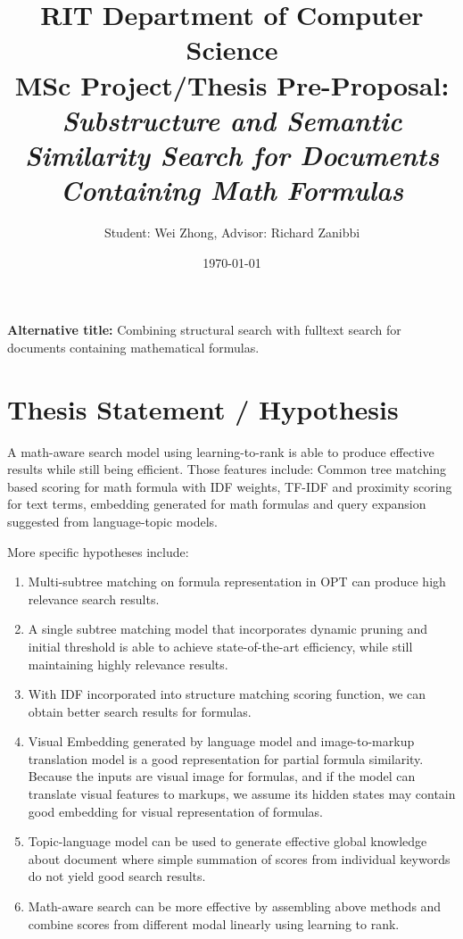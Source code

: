 \documentclass[11pt]{artikel3}
\title{RIT Department of Computer Science\\MSc Project/Thesis Pre-Proposal:\\\emph{Substructure and Semantic Similarity Search for Documents
Containing Math Formulas}}
\author{Student: Wei Zhong, Advisor: Richard Zanibbi}
\date{\today}
\begin{document}
\maketitle

\textbf{Alternative title:} Combining structural search with fulltext search for documents containing mathematical formulas.

\section{Thesis Statement / Hypothesis}
A math-aware search model using learning-to-rank is able to produce effective results while still being efficient. 
Those features include: Common tree matching based scoring for math formula with IDF weights, TF-IDF and proximity scoring for text terms, embedding generated for math formulas and query expansion suggested from language-topic models.

More specific hypotheses include:
\begin{enumerate}
	\item Multi-subtree matching on formula representation in OPT can produce high relevance search results.~\cite{zhong2019structural}
	\item A single subtree matching model that incorporates dynamic pruning and initial threshold is able to achieve state-of-the-art efficiency, while still maintaining highly relevance results.~\cite{zhong2020speed}

	\item With IDF incorporated into structure matching scoring function, we can obtain better search results for formulas.
	\item Visual Embedding generated by language model and image-to-markup translation model is a good representation for partial formula similarity. Because the inputs are visual image for formulas, and if the model can translate visual features to markups, we assume its hidden states may contain good embedding for visual representation of formulas.
	\item Topic-language model can be used to generate effective global knowledge about document where simple summation of scores from individual keywords do not yield good search results.
	\item Math-aware search can be more effective by assembling above methods and combine scores from different modal linearly using learning to rank.
\end{enumerate}
\end{document}
